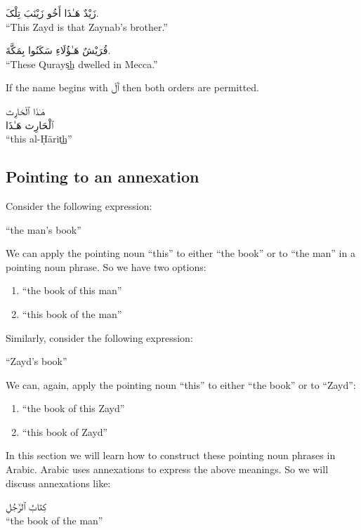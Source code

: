 \documentclass[
  10pt,
]{book}
\providecommand{\tightlist}{%
  \setlength{\itemsep}{0pt}\setlength{\parskip}{0pt}}
\begin{document}
\foreignlanguage{arabic}{زَيْدٌ هَـٰذَا أَخُو زَيْنَبَ تِلْکَ.}\\
\enquote{This Zayd is that Zaynab's brother.}

\foreignlanguage{arabic}{قُرَيْشٌ هَـٰؤُلَاءِ سَکَنُوا بِمَکَّةَ.}\\
\enquote{These Qurays͟h dwelled in Mecca.}

If the name begins with \foreignlanguage{arabic}{ٱَلْ} then both orders are permitted.

\foreignlanguage{arabic}{هَـٰذَا ٱلْحَارِث}\\
\foreignlanguage{arabic}{ٱلْحَارِث هَـٰذَا}\\
\enquote{this al-Ḥārit͟h}

\subsection{Pointing to an annexation}\label{pointing-to-an-annexation}

Consider the following expression:

\enquote{the man's book}

We can apply the pointing noun \enquote{this} to either \enquote{the book} or to \enquote{the man} in a pointing noun phrase. So we have two options:

\begin{enumerate}
\def\labelenumi{\roman{enumi}.}
\tightlist
\item
  \enquote{the book of this man}
\item
  \enquote{this book of the man}
\end{enumerate}

Similarly, consider the following expression:

\enquote{Zayd's book}

We can, again, apply the pointing noun \enquote{this} to either \enquote{the book} or to \enquote{Zayd}:

\begin{enumerate}
\def\labelenumi{\roman{enumi}.}
\tightlist
\item
  \enquote{the book of this Zayd}
\item
  \enquote{this book of Zayd}
\end{enumerate}

In this section we will learn how to construct these pointing noun phrases in Arabic.
Arabic uses annexations to express the above meanings. So we will discuss annexations like:

\foreignlanguage{arabic}{کِتَابُ ٱلرَّجُلِ}\\
\enquote{the book of the man}
\end{document}
